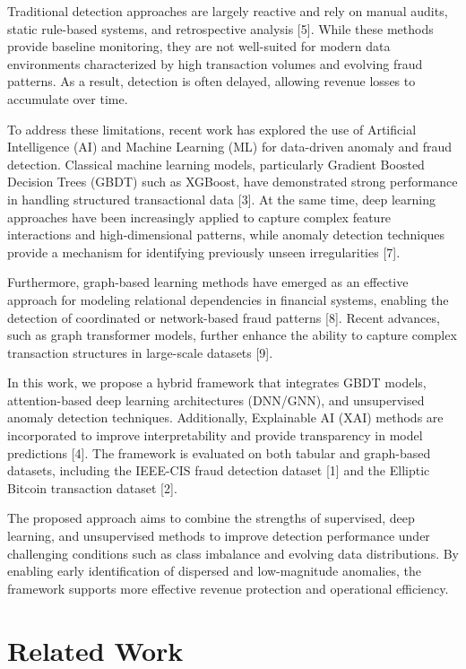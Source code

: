 \documentclass[conference]{IEEEtran}
\begin{document}
Traditional detection approaches are largely reactive and rely on manual audits, static rule-based systems, and retrospective analysis [5]. While these methods provide baseline monitoring, they are not well-suited for modern data environments characterized by high transaction volumes and evolving fraud patterns. As a result, detection is often delayed, allowing revenue losses to accumulate over time.

To address these limitations, recent work has explored the use of Artificial Intelligence (AI) and Machine Learning (ML) for data-driven anomaly and fraud detection. Classical machine learning models, particularly Gradient Boosted Decision Trees (GBDT) such as XGBoost, have demonstrated strong performance in handling structured transactional data [3]. At the same time, deep learning approaches have been increasingly applied to capture complex feature interactions and high-dimensional patterns, while anomaly detection techniques provide a mechanism for identifying previously unseen irregularities [7].

Furthermore, graph-based learning methods have emerged as an effective approach for modeling relational dependencies in financial systems, enabling the detection of coordinated or network-based fraud patterns [8]. Recent advances, such as graph transformer models, further enhance the ability to capture complex transaction structures in large-scale datasets [9].

In this work, we propose a hybrid framework that integrates GBDT models, attention-based deep learning architectures (DNN/GNN), and unsupervised anomaly detection techniques. Additionally, Explainable AI (XAI) methods are incorporated to improve interpretability and provide transparency in model predictions [4]. The framework is evaluated on both tabular and graph-based datasets, including the IEEE-CIS fraud detection dataset [1] and the Elliptic Bitcoin transaction dataset [2].

The proposed approach aims to combine the strengths of supervised, deep learning, and unsupervised methods to improve detection performance under challenging conditions such as class imbalance and evolving data distributions. By enabling early identification of dispersed and low-magnitude anomalies, the framework supports more effective revenue protection and operational efficiency.


\section{Related Work}
\end{document}
